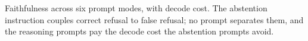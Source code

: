 \begin{table}[t]
\caption{\small Faithfulness across six prompt modes, with decode cost. The abstention instruction couples correct refusal to false refusal; no prompt separates them, and the reasoning prompts pay the decode cost the abstention prompts avoid.}
\label{tab:prompting}
\end{table}